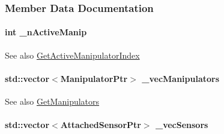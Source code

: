 \subsubsection{Member Data Documentation}
\hypertarget{classOpenRAVE_1_1RobotBase_aa111f44aea6f2b407af5ed096cd48edb}{
\paragraph[{\_\-nActiveManip}]{\setlength{\rightskip}{0pt plus 5cm}int {\bf \_\-nActiveManip}}\hfill}
\label{classOpenRAVE_1_1RobotBase_aa111f44aea6f2b407af5ed096cd48edb}
\begin{DoxySeeAlso}{See also}
\hyperlink{classOpenRAVE_1_1RobotBase_a1b663dc6bca08704a562fdc74e25dfd0}{GetActiveManipulatorIndex} 
\end{DoxySeeAlso}
\hypertarget{classOpenRAVE_1_1RobotBase_affad71c6cc8ac660314a5e10e4caae34}{
\paragraph[{\_\-vecManipulators}]{\setlength{\rightskip}{0pt plus 5cm}std::vector$<$ManipulatorPtr$>$ {\bf \_\-vecManipulators}}\hfill}
\label{classOpenRAVE_1_1RobotBase_affad71c6cc8ac660314a5e10e4caae34}
\begin{DoxySeeAlso}{See also}
\hyperlink{classOpenRAVE_1_1RobotBase_a93fa4dbd84cc30d4dae78ee20d816ce3}{GetManipulators} 
\end{DoxySeeAlso}
\hypertarget{classOpenRAVE_1_1RobotBase_aac98310b73ec888db282a3ca58db245a}{
\paragraph[{\_\-vecSensors}]{\setlength{\rightskip}{0pt plus 5cm}std::vector$<$AttachedSensorPtr$>$ {\bf \_\-vecSensors}}\hfill}
